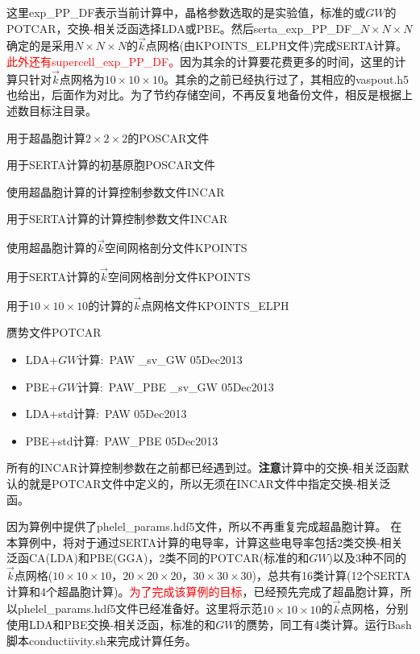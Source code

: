 {这里\textrm{exp\_PP\_DF}表示当前计算中，晶格参数选取的是实验值，标准的或$GW$的\textrm{POTCAR}，交换-相关泛函选择\textrm{LDA}或\textrm{PBE}。然后\textrm{serta\_exp\_PP\_DF\_$N\times N\times N$}确定的是采用$N\times N\times N$的$\vec k$点网格(由\textrm{KPOINTS\_ELPH}文件)完成\textrm{SERTA}计算。\textcolor{red}{此外还有\textrm{supercell\_exp\_PP\_DF}。}因为其余的计算要花费更多的时间，这里的计算只针对$\vec k$点网格为$10\times10\times10$。其余的之前已经执行过了，其相应的\textrm{vaspout.h5}也给出，后面作为对比。为了节约存储空间，不再反复地备份文件，相反是根据上述数目标注目录。

用于超晶胞计算$2\times2\times2$的\textrm{POSCAR}文件

用于\textrm{SERTA}计算的初基原胞\textrm{POSCAR}文件

使用超晶胞计算的计算控制参数文件\textrm{INCAR}

用于\textrm{SERTA}计算的计算控制参数文件\textrm{INCAR}

使用超晶胞计算的$\vec k$空间网格剖分文件\textrm{KPOINTS}

用于\textrm{SERTA}计算的$\vec k$空间网格剖分文件\textrm{KPOINTS}

用于$10\times10\times10$的计算的$\vec k$点网格文件\textrm{KPOINTS\_ELPH}

赝势文件\textrm{POTCAR}
\begin{itemize}
	\item \textrm{LDA}+$GW$计算:~\textrm{PAW \_sv\_GW 05Dec2013}
	\item \textrm{PBE}+$GW$计算:~\textrm{PAW\_PBE \_sv\_GW 05Dec2013}
	\item \textrm{LDA+std}计算:~\textrm{PAW  05Dec2013}
	\item \textrm{PBE+std}计算:~\textrm{PAW\_PBE  05Dec2013}
\end{itemize}
所有的\textrm{INCAR}计算控制参数在之前都已经遇到过。\textbf{注意}计算中的交换-相关泛函默认的就是\textrm{POTCAR}文件中定义的，所以无须在\textrm{INCAR}文件中指定交换-相关泛函。

因为算例中提供了\textrm{phelel\_params.hdf5}文件，所以不再重复完成超晶胞计算。
在本算例中，将对于通过\textrm{SERTA}计算的电导率，计算这些电导率包括2类交换-相关泛函\textrm{CA(LDA)和PBE(GGA)}，2类不同的\textrm{POTCAR}(标准的和$GW$)以及3种不同的$\vec k$点网格($10\times10\times10$，$20\times20\times20$，$30\times30\times30$)，总共有16类计算(12个\textrm{SERTA}计算和4个超晶胞计算)。\textcolor{red}{为了完成该算例的目标}，已经预先完成了超晶胞计算，所以\textrm{phelel\_params.hdf5}文件已经准备好。这里将示范$10\times10\times10$的$\vec k$点网格，分别使用\textrm{LDA}和\textrm{PBE}交换-相关泛函，标准的和$GW$的赝势，同工有4类计算。运行\textrm{Bash}脚本\textrm{conductiivity.sh}来完成计算任务。

}
